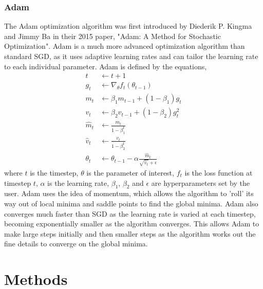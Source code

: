 \documentclass[twocolumn,pra,floatfix]{revtex4-2}
\begin{document}
            \subsubsection{Adam}\label{Adam}

                The Adam optimization algorithm was first introduced by Diederik P. Kingma and Jimmy Ba in their 2015 paper, "Adam: A Method for Stochastic Optimization". Adam is a much more advanced optimization algorithm than standard SGD, as it uses adaptive learning rates and can tailor the learning rate to each individual parameter. Adam is defined by the equations,
                \begin{equation}
                    \begin{aligned}
                        t &\leftarrow t + 1 \\
                        g_t &\leftarrow \nabla_{\theta} f_t(\theta_{t-1}) \\
                        m_t &\leftarrow \beta_1 m_{t-1} + (1 - \beta_1) g_t \\
                        v_t &\leftarrow \beta_2 v_{t-1} + (1 - \beta_2) g_t^2 \\
                        \hat{m}_t &\leftarrow \frac{m_t}{1 - \beta_1^t} \\
                        \hat{v}_t &\leftarrow \frac{v_t}{1 - \beta_2^t} \\
                        \theta_t &\leftarrow \theta_{t-1} - \alpha \frac{\hat{m}_t}{\sqrt{\hat{v}_t} + \epsilon}
                    \end{aligned}
                \end{equation}
                where $t$ is the timestep, $\theta$ is the parameter of interest, $f_t$ is the loss function at timestep $t$, $\alpha$ is the learning rate, $\beta_1$, $\beta_2$ and $\epsilon$ are hyperparameters set by the user. Adam uses the idea of momentum, which allows the algorithm to 'roll' its way out of local minima and saddle points to find the global minima. Adam also converges much faster than SGD as the learning rate is varied at each timestep, becoming exponentially smaller as the algorithm converges. This allows Adam to make large steps initially and then smaller steps as the algorithm works out the fine details to converge on the global minima.

    \section{Methods}
\end{document}
